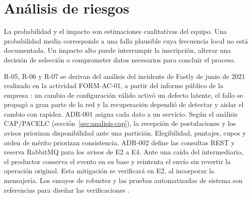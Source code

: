 \section{Análisis de riesgos}
\label{sec:analisis-riesgos}

La probabilidad y el impacto son estimaciones cualitativas del equipo. Una probabilidad media
corresponde a una falla plausible cuya frecuencia local no está documentada.
Un impacto alto puede interrumpir la inscripción, alterar una decisión de selección
o comprometer datos necesarios para concluir el proceso.

R-05, R-06 y R-07 se derivan del análisis del incidente de Fastly de junio de 2021 realizado en la
actividad FORM-AC-01, a partir del informe público de la empresa \cite{rockwell2021outage}: un cambio de
configuración válido activó un defecto latente, el fallo se propagó a gran parte de la red y la
recuperación dependió de detectar y aislar el cambio con rapidez. ADR-001 asigna cada dato a un servicio. Según el análisis CAP/PACELC
(sección~\ref{sec:analisis-cap}), la recepción de postulaciones y los avisos priorizan
disponibilidad ante una partición. Elegibilidad, puntajes, cupos y orden de mérito priorizan
consistencia. ADR-002 define las consultas REST y reserva RabbitMQ para los avisos de E2 a E4.
Ante una caída del intermediario, el productor conserva el evento en su base y reintenta el
envío sin revertir la operación original. Esta mitigación se verificará en E2, al
incorporar la mensajería. Los ensayos de robustez y las pruebas automatizadas de sistema
son referencias para diseñar las verificaciones
\cite{giamattei2024automated,arcuri2023building}.

